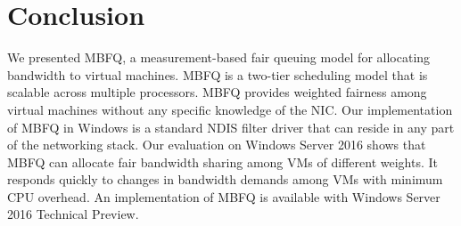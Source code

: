 \section{Conclusion}
\label{sec:conclusion}

We presented MBFQ, a measurement-based fair queuing model for allocating bandwidth to virtual machines.
MBFQ is a two-tier scheduling model that is scalable across multiple processors.  MBFQ provides weighted
fairness among virtual machines without any specific knowledge of the NIC.  Our implementation 
of MBFQ in Windows is a standard NDIS filter driver that can reside in any part of the networking stack.  Our evaluation
on Windows Server 2016 shows that MBFQ can allocate fair bandwidth sharing among VMs of different weights. It
responds quickly to changes in bandwidth demands among VMs with minimum CPU overhead.  An implementation of 
MBFQ is available with Windows Server 2016 Technical Preview.



